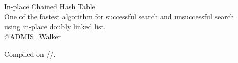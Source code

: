 \begin{titlepage}


\vspace*{120truept}
\begin{center}
  \leavevmode\\\leavevmode\\ %
  \vspace{30truept}
  \huge{In-place Chained Hash Table}\\ %
  \large{One of the fastest algorithm for successful search and unsuccessful search\\using in-place doubly linked list.}\\ %
\vspace{100truept}
\leavevmode \newline %
\leavevmode \newline %
\LARGE{@ADMIS\_Walker}\\ %
\end{center}


\vspace*{\fill} %
\begin{flushright}
  Compiled on \number\year/\number\month/\number\day.
\end{flushright}

\end{titlepage}
